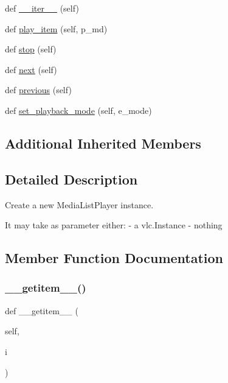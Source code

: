 \begin{DoxyCompactItemize}
\item 
def \hyperlink{classvlc_1_1_media_list_player_a45163c19b7c87f553c6f1d055d4668cb}{\+\_\+\+\_\+iter\+\_\+\+\_\+} (self)
\item 
def \hyperlink{classvlc_1_1_media_list_player_a7b4dea65b1a9aebd68903e99c8f2a35b}{play\+\_\+item} (self, p\+\_\+md)
\item 
def \hyperlink{classvlc_1_1_media_list_player_a26ca7c1c7fcdd35378e7be97727047a6}{stop} (self)
\item 
def \hyperlink{classvlc_1_1_media_list_player_a9dbee9488c9365114fed347d1a8846f1}{next} (self)
\item 
def \hyperlink{classvlc_1_1_media_list_player_a14cf85a983795cd01d9825b5bad079e7}{previous} (self)
\item 
def \hyperlink{classvlc_1_1_media_list_player_aad8459f0e126cfbb1a8bd73bef98ac1b}{set\+\_\+playback\+\_\+mode} (self, e\+\_\+mode)
\end{DoxyCompactItemize}
\subsection*{Additional Inherited Members}


\subsection{Detailed Description}
\begin{DoxyVerb}Create a new MediaListPlayer instance.

It may take as parameter either:
  - a vlc.Instance
  - nothing\end{DoxyVerb}
 

\subsection{Member Function Documentation}
\mbox{\label{classvlc_1_1_media_list_player_af2c6b7930c773edecd6d320e4c263421}} 
\subsubsection{\texorpdfstring{\+\_\+\+\_\+getitem\+\_\+\+\_\+()}{\_\_getitem\_\_()}}
{\footnotesize\ttfamily def \+\_\+\+\_\+getitem\+\_\+\+\_\+ (\begin{DoxyParamCaption}\item[{}]{self,  }\item[{}]{i }\end{DoxyParamCaption})}

